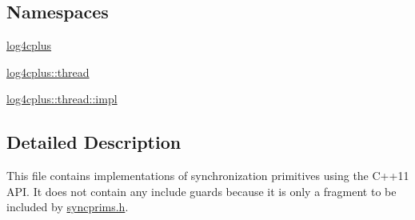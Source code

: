 \subsection*{Namespaces}
\begin{DoxyCompactItemize}
\item 
\hyperlink{namespacelog4cplus}{log4cplus}
\item 
\hyperlink{namespacelog4cplus_1_1thread}{log4cplus\-::thread}
\item 
\hyperlink{namespacelog4cplus_1_1thread_1_1impl}{log4cplus\-::thread\-::impl}
\end{DoxyCompactItemize}


\subsection{Detailed Description}
This file contains implementations of synchronization primitives using the C++11 A\-P\-I. It does not contain any include guards because it is only a fragment to be included by \hyperlink{syncprims_8h}{syncprims.\-h}. 